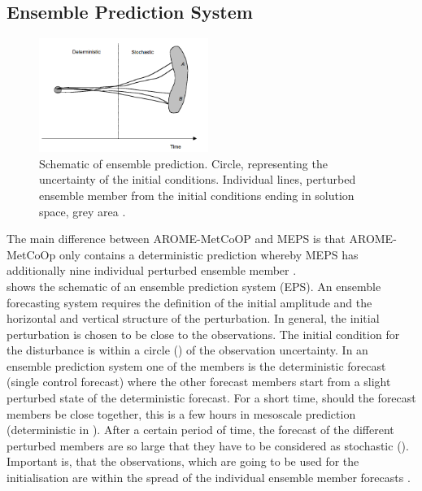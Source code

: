 \subsection{Ensemble Prediction System}
\begin{figure}[H]
	\centering
    \includegraphics[width=0.49\textwidth]{./fig_MEPS/ensemble}
    \caption{Schematic of ensemble prediction. Circle, representing the uncertainty of the initial conditions. Individual lines, perturbed ensemble member from the initial conditions ending in solution space, grey area \citep{kalnay_atmospheric_2003}.}\label{fig:MEPS:kalnay_ens}
\end{figure}
\noindent
The main difference between AROME-MetCoOP and MEPS is that AROME-MetCoOp only contains a deterministic prediction whereby MEPS has additionally nine individual perturbed ensemble member \citep{metcoop_wiki_description_2017}. 
\\
 shows the schematic of an ensemble prediction system (EPS). An ensemble forecasting system requires the definition of the initial amplitude and the horizontal and vertical structure of the perturbation. In general, the initial perturbation is chosen to be close to the observations. The initial condition for the disturbance is within a circle () of the observation uncertainty. In an ensemble prediction system one of the members is the deterministic forecast (single control forecast) where the other forecast members start from a slight perturbed state of the deterministic forecast. For a short time, should the forecast members be close together, this is a few hours in mesoscale prediction (deterministic in ). After a certain period of time, the forecast of the different perturbed members are so large that they have to be considered as stochastic (). 
\\
Important is, that the observations, which are going to be used for the initialisation are within the spread of the individual ensemble member forecasts \citep{kalnay_atmospheric_2003}.

